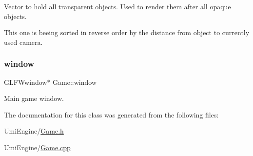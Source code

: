 Vector to hold all transparent objects. Used to render them after all opaque objects. 

This one is beeing sorted in reverse order by the distance from object to currently used camera. \mbox{\label{class_game_ad9bc7cf39168a1ceaf77d6177116aa94}} 
\subsubsection{\texorpdfstring{window}{window}}
{\footnotesize\ttfamily G\+L\+F\+Wwindow$\ast$ Game\+::window\hspace{0.3cm}{\ttfamily [protected]}}



Main game window. 



The documentation for this class was generated from the following files\+:\begin{DoxyCompactItemize}
\item 
Umi\+Engine/\mbox{\hyperlink{_game_8h}{Game.\+h}}\item 
Umi\+Engine/\mbox{\hyperlink{_game_8cpp}{Game.\+cpp}}\end{DoxyCompactItemize}
